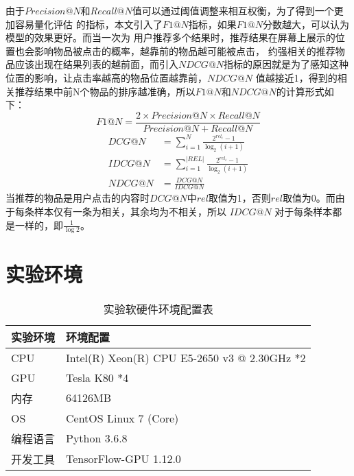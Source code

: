 由于$Precision@N$和$Recall@N$值可以通过阈值调整来相互权衡，为了得到一个更加容易量化评估%
的指标，本文引入了$F1@N$指标，如果$F1@N$分数越大，可以认为模型的效果更好。而当一次为%
用户推荐多个结果时，推荐结果在屏幕上展示的位置也会影响物品被点击的概率，越靠前的物品越可能被点击，%
约强相关的推荐物品应该出现在结果列表的越前面，而引入$NDCG@N$指标的原因就是为了感知这种%
位置的影响，让点击率越高的物品位置越靠前，$NDCG@N$%
值越接近1，得到的相关推荐结果中前N个物品的排序越准确，所以$F1@N$和$NDCG@N$的计算形式如下：
\begin{equation}
F1@N=\frac{2\times Precision@N\times Recall@N}{Precision@N+Recall@N}
\end{equation}
\begin{equation}
  \begin{aligned}
  DCG@N &= \sum_{i=1}^{N} \frac{2^{rel_{i}}-1}{\log _{2}(i+1)} \\
  IDCG@N &= \sum_{i=1}^{|REL|} \frac{2^{rel_{i}}-1}{\log _{2}(i+1)} \\
  NDCG@N &= \frac{DCG@N}{IDCG@N}
  \label{E21}
  \end{aligned}
\end{equation}
当推荐的物品是用户点击的内容时$DCG@N$中$rel$取值为1，否则$rel$取值为0。而由于每条样本仅有一条为相关，其余均为不相关，所以 $IDCG@N$ 对于每条样本都是一样的，即$\frac{1}{\log 2}$。

\section{实验环境}


\begin{table}[H]
\centering
\caption{实验软硬件环境配置表}
\label{tab:set}
  \begin{tabular}{@{}ll@{}}
  \toprule
  实验环境 & 环境配置                                  \\ \midrule
  CPU  & Intel(R) Xeon(R) CPU E5-2650 v3 @ 2.30GHz *2 \\
  GPU  & Tesla K80 *4                                 \\
  内存   & 64126MB                                      \\
  OS   & CentOS Linux 7 (Core)                        \\
  编程语言 & Python 3.6.8                                 \\
  开发工具 & TensorFlow-GPU 1.12.0                        \\ \bottomrule
  \end{tabular}
\end{table}

